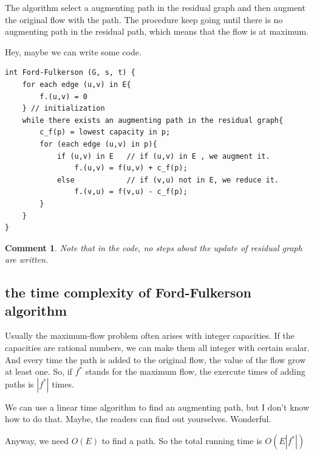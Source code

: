 \documentclass[a4paper, 10pt]{ctexart} %
\newtheorem{corollary}{Comment}
\begin{document}
The algorithm select a augmenting path in the 
residual graph and then augment the original 
flow with the path. The procedure 
keep going until there is no augmenting path 
in the residual path, which means that 
the flow is at maximum.

Hey, maybe we can write some code.

\begin{verbatim}
int Ford-Fulkerson (G, s, t) {
    for each edge (u,v) in E{
        f.(u,v) = 0
    } // initialization
    while there exists an augmenting path in the residual graph{
        c_f(p) = lowest capacity in p;
        for (each edge (u,v) in p){
            if (u,v) in E   // if (u,v) in E , we augment it.
                f.(u,v) = f(u,v) + c_f(p);
            else            // if (v,u) not in E, we reduce it.
                f.(v,u) = f(v,u) - c_f(p);
        }
    }
}
\end{verbatim}

\begin{corollary}
Note that in the code, no steps about
the update of residual graph are written.
\end{corollary}

\subsection{the time complexity of Ford-Fulkerson algorithm}
Usually the maximum-flow problem often 
arises with integer capacities. If 
the capacities are rational numbers, 
we can make them all integer 
with certain scalar. 
And every time the path is added to 
the original flow, the value of the 
flow grow at least one. So, if $f^{*}$
stands for the 
maximum flow, the exercute times of 
adding paths is $\left| f^{*} \right| $ times.

We can use a linear time algorithm to 
find an augmenting path, but I don't know how 
to do that. Maybe, the readers can find out yourselves.
Wonderful.

Anyway, we need $O\left(E\right)$ to find a path.
So the total running  time is $O  \left(E \left| f^{*}\right| \right)$
\end{document}
